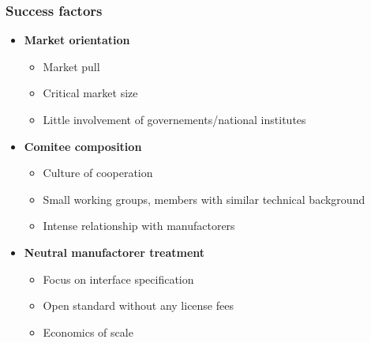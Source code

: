 \begin{frame}
  \frametitle{Success factors}
  
  \begin{itemize}
    \item \textbf{Market orientation}
      \begin{itemize}
       \item Market pull
       \item Critical market size
       \item Little involvement of governements/national institutes
      \end{itemize}
  \end{itemize}

  \begin{itemize}
    \item \textbf{Comitee composition}
      \begin{itemize}
	\item Culture of cooperation
	\item Small working groups, members with similar technical background
	\item Intense relationship with manufactorers
      \end{itemize}
  \end{itemize}

  \begin{itemize}
    \item \textbf{Neutral manufactorer treatment}
      \begin{itemize}
       \item Focus on interface specification
       \item Open standard without any license fees
       \item Economics of scale       
      \end{itemize}
  \end{itemize}
\end{frame}
